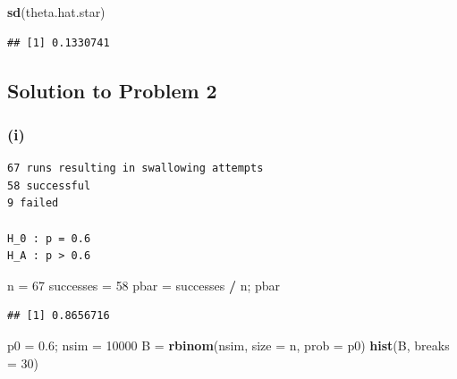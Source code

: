 \documentclass[]{article}
\newenvironment{Shaded}{\begin{snugshade}}{\end{snugshade}}
\newcommand{\DataTypeTok}[1]{\textcolor[rgb]{0.13,0.29,0.53}{#1}}
\newcommand{\DecValTok}[1]{\textcolor[rgb]{0.00,0.00,0.81}{#1}}
\newcommand{\FloatTok}[1]{\textcolor[rgb]{0.00,0.00,0.81}{#1}}
\newcommand{\KeywordTok}[1]{\textcolor[rgb]{0.13,0.29,0.53}{\textbf{#1}}}
\newcommand{\NormalTok}[1]{#1}
\newcommand{\OperatorTok}[1]{\textcolor[rgb]{0.81,0.36,0.00}{\textbf{#1}}}
\newcommand{\StringTok}[1]{\textcolor[rgb]{0.31,0.60,0.02}{#1}}
\begin{document}
\begin{Shaded}
\begin{Highlighting}[]
\KeywordTok{sd}\NormalTok{(theta.hat.star)}
\end{Highlighting}
\end{Shaded}

\begin{verbatim}
## [1] 0.1330741
\end{verbatim}

\hypertarget{solution-to-problem-2}{%
\subsection{Solution to Problem 2}\label{solution-to-problem-2}}

\hypertarget{i-1}{%
\subsubsection{(i)}\label{i-1}}

\begin{verbatim}
67 runs resulting in swallowing attempts
58 successful
9 failed

H_0 : p = 0.6
H_A : p > 0.6

\end{verbatim}

\begin{Shaded}
\begin{Highlighting}[]
\NormalTok{n =}\StringTok{ }\DecValTok{67}
\NormalTok{successes =}\StringTok{ }\DecValTok{58}
\NormalTok{pbar =}\StringTok{ }\NormalTok{successes }\OperatorTok{/}\StringTok{ }\NormalTok{n; pbar}
\end{Highlighting}
\end{Shaded}

\begin{verbatim}
## [1] 0.8656716
\end{verbatim}

\begin{Shaded}
\begin{Highlighting}[]
\NormalTok{p0 =}\StringTok{ }\FloatTok{0.6}\NormalTok{; nsim =}\StringTok{ }\DecValTok{10000}
\NormalTok{B =}\StringTok{ }\KeywordTok{rbinom}\NormalTok{(nsim, }\DataTypeTok{size =}\NormalTok{ n, }\DataTypeTok{prob =}\NormalTok{ p0)}
\KeywordTok{hist}\NormalTok{(B, }\DataTypeTok{breaks =} \DecValTok{30}\NormalTok{)}
\end{Highlighting}
\end{Shaded}
\end{document}
